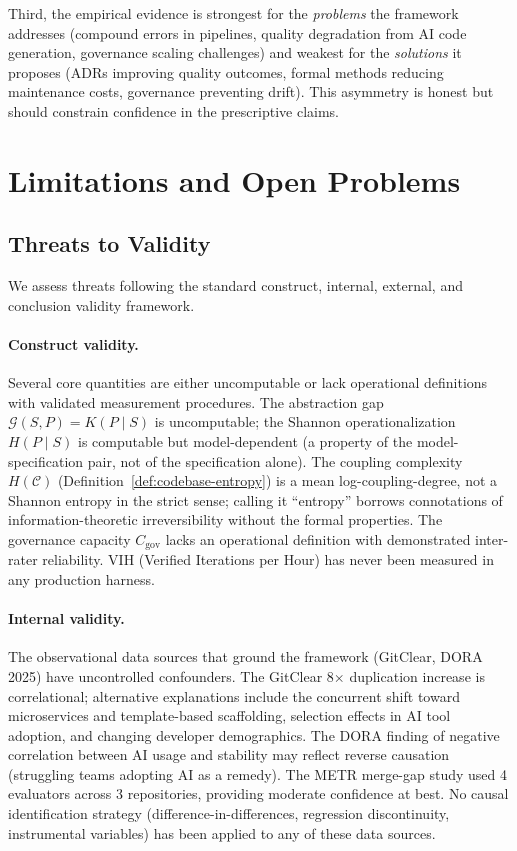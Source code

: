 \documentclass[11pt, a4paper, logo, copyright]{googledeepmind}
\begin{document}
Third, the empirical evidence is strongest for the \emph{problems} the framework
addresses (compound errors in pipelines, quality degradation from AI code
generation, governance scaling challenges) and weakest for the \emph{solutions}
it proposes (ADRs improving quality outcomes, formal methods reducing
maintenance costs, governance preventing drift).  This asymmetry is honest but
should constrain confidence in the prescriptive claims.


\section{Limitations and Open Problems}
\label{sec:limitations}

\subsection{Threats to Validity}
\label{sec:threats}

We assess threats following the standard construct, internal, external, and conclusion validity framework.

\paragraph{Construct validity.} Several core quantities are either uncomputable or lack operational definitions with validated measurement procedures. The abstraction gap $\mathcal{G}(S,P) = K(P \mid S)$ is uncomputable; the Shannon operationalization $H(P \mid S)$ is computable but model-dependent (a property of the model-specification pair, not of the specification alone). The coupling complexity $H(\mathcal{C})$ (Definition~\ref{def:codebase-entropy}) is a mean log-coupling-degree, not a Shannon entropy in the strict sense; calling it ``entropy'' borrows connotations of information-theoretic irreversibility without the formal properties. The governance capacity $C_{\text{gov}}$ lacks an operational definition with demonstrated inter-rater reliability. VIH (Verified Iterations per Hour) has never been measured in any production harness.

\paragraph{Internal validity.} The observational data sources that ground the framework (GitClear, DORA 2025) have uncontrolled confounders. The GitClear 8$\times$ duplication increase is correlational; alternative explanations include the concurrent shift toward microservices and template-based scaffolding, selection effects in AI tool adoption, and changing developer demographics. The DORA finding of negative correlation between AI usage and stability may reflect reverse causation (struggling teams adopting AI as a remedy). The METR merge-gap study used 4 evaluators across 3 repositories, providing moderate confidence at best. No causal identification strategy (difference-in-differences, regression discontinuity, instrumental variables) has been applied to any of these data sources.
\end{document}
